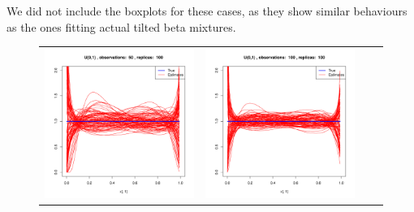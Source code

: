 We did not include the boxplots for these cases, as they show similar behaviours as the ones fitting actual tilted beta mixtures.

\begin{figure}[h]
\begin{tabular}{cccc}

	\includegraphics[width=\textwidth/4]{../img/uniform/tilted/K1/densities/n50_R100.pdf}
	&
	\includegraphics[width=\textwidth/4]{../img/uniform/tilted/K1/densities/n100_R100.pdf}

\end{tabular}
\end{figure}

